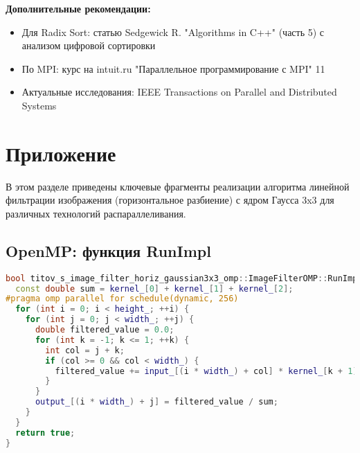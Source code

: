 \documentclass[12pt]{article}
\begin{document}
\noindent\textbf{Дополнительные рекомендации:}
\begin{itemize}
\item Для Radix Sort: статью Sedgewick R. "Algorithms in C++" (часть 5) с анализом цифровой сортировки
\item По MPI: курс на intuit.ru "Параллельное программирование с MPI" 11
\item Актуальные исследования: IEEE Transactions on Parallel and Distributed Systems
\end{itemize}
\appendix
\section*{Приложение}

\hspace*{1.25em}В этом разделе приведены ключевые фрагменты реализации алгоритма линейной фильтрации изображения (горизонтальное разбиение) с ядром Гаусса 3x3 для различных технологий распараллеливания.

\subsection*{OpenMP: функция RunImpl}
\begin{lstlisting}[language=C++]
bool titov_s_image_filter_horiz_gaussian3x3_omp::ImageFilterOMP::RunImpl() {
  const double sum = kernel_[0] + kernel_[1] + kernel_[2];
#pragma omp parallel for schedule(dynamic, 256)
  for (int i = 0; i < height_; ++i) {
    for (int j = 0; j < width_; ++j) {
      double filtered_value = 0.0;
      for (int k = -1; k <= 1; ++k) {
        int col = j + k;
        if (col >= 0 && col < width_) {
          filtered_value += input_[(i * width_) + col] * kernel_[k + 1];
        }
      }
      output_[(i * width_) + j] = filtered_value / sum;
    }
  }
  return true;
}
\end{lstlisting}
\end{document}
